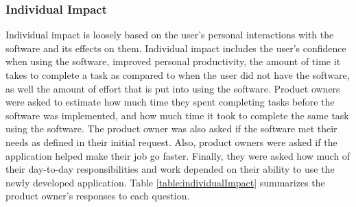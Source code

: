 

\subsubsection{Individual Impact}
Individual impact is loosely based on the user's personal interactions with the software and its effects on them. Individual impact includes the user's confidence when using the software, improved personal productivity, the amount of time it takes to complete a task as compared to when the user did not have the software, as well the amount of effort that is put into using the software. Product owners were asked to estimate how much time they spent completing tasks before the software was implemented, and how much time it took to complete the same task using the software. The product owner was also asked if the software met their needs as defined in their initial request. Also, product owners were asked if the application helped make their job go faster. Finally, they were asked how much of their day-to-day responsibilities and work depended on their ability to use the newly developed application. Table \ref{table:individualImpact} summarizes the product owner's responses to each question.

